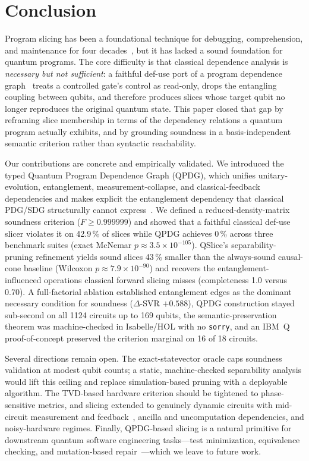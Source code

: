 \documentclass[10pt,conference]{IEEEtran}
\theoremstyle{definition}
\begin{document}
\section{Conclusion}\label{sec:conclusion}

Program slicing has been a foundational technique for debugging, comprehension, and maintenance for four decades~\cite{weiser1982programmers, tip1994a, gallagher2025program}, but it has lacked a sound foundation for quantum programs. The core difficulty is that classical dependence analysis is \emph{necessary but not sufficient}: a faithful def-use port of a program dependence graph~\cite{ferrante1987pdg, horwitz1990interprocedural} treats a controlled gate's control as read-only, drops the entangling coupling between qubits, and therefore produces slices whose target qubit no longer reproduces the original quantum state. This paper closed that gap by reframing slice membership in terms of the dependency relations a quantum program actually exhibits, and by grounding soundness in a basis-independent semantic criterion rather than syntactic reachability.

Our contributions are concrete and empirically validated. We introduced the typed Quantum Program Dependence Graph (QPDG), which unifies unitary-evolution, entanglement, measurement-collapse, and classical-feedback dependencies and makes explicit the entanglement dependency that classical PDG/SDG structurally cannot express~\cite{sinha1999sdg}. We defined a reduced-density-matrix soundness criterion ($F \geq 0.999999$) and showed that a faithful classical def-use slicer violates it on 42.9\,\% of slices while QPDG achieves 0\,\% across three benchmark suites (exact McNemar $p \approx 3.5\times10^{-105}$). QSlice's separability-pruning refinement yields sound slices 43\,\% smaller than the always-sound causal-cone baseline (Wilcoxon $p \approx 7.9\times10^{-90}$) and recovers the entanglement-influenced operations classical forward slicing misses (completeness 1.0 versus 0.70). A full-factorial ablation established entanglement edges as the dominant necessary condition for soundness ($\Delta$-SVR $+0.588$), QPDG construction stayed sub-second on all 1124 circuits up to 169 qubits, the semantic-preservation theorem was machine-checked in Isabelle/HOL with no \texttt{sorry}, and an IBM~Q proof-of-concept preserved the criterion marginal on 16 of 18 circuits.

Several directions remain open. The exact-statevector oracle caps soundness validation at modest qubit counts; a static, machine-checked separability analysis would lift this ceiling and replace simulation-based pruning with a deployable algorithm. The TVD-based hardware criterion should be tightened to phase-sensitive metrics, and slicing extended to genuinely dynamic circuits with mid-circuit measurement and feedback~\cite{cross2022openqasm3}, ancilla and uncomputation dependencies, and noisy-hardware regimes. Finally, QPDG-based slicing is a natural primitive for downstream quantum software engineering tasks---test minimization, equivalence checking, and mutation-based repair~\cite{nayak2023qpac, zhao2023qchecker}---which we leave to future work.
\end{document}
